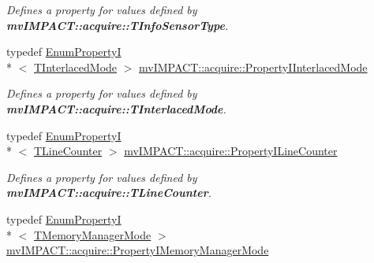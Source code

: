 \begin{DoxyCompactItemize}
\begin{DoxyCompactList}\small\item\em Defines a property for values defined by {\bfseries mv\+I\+M\+P\+A\+C\+T\+::acquire\+::\+T\+Info\+Sensor\+Type}. \end{DoxyCompactList}\item 
\hypertarget{group___device_specific_interface_gad01158960a8635ab8a2bd3199056045c}{typedef \hyperlink{classmv_i_m_p_a_c_t_1_1acquire_1_1_enum_property_i}{Enum\+Property\+I}\\*
$<$ \hyperlink{group___device_specific_interface_gafb928ff52f5c386fa1bac255d6850ff9}{T\+Interlaced\+Mode} $>$ \hyperlink{group___device_specific_interface_gad01158960a8635ab8a2bd3199056045c}{mv\+I\+M\+P\+A\+C\+T\+::acquire\+::\+Property\+I\+Interlaced\+Mode}}\label{group___device_specific_interface_gad01158960a8635ab8a2bd3199056045c}

\begin{DoxyCompactList}\small\item\em Defines a property for values defined by {\bfseries mv\+I\+M\+P\+A\+C\+T\+::acquire\+::\+T\+Interlaced\+Mode}. \end{DoxyCompactList}\item 
\hypertarget{group___device_specific_interface_ga104cc83eecc5f80f03154860ac2068ff}{typedef \hyperlink{classmv_i_m_p_a_c_t_1_1acquire_1_1_enum_property_i}{Enum\+Property\+I}\\*
$<$ \hyperlink{group___device_specific_interface_gab9051a0d97eafeaff2951aa0196f14eb}{T\+Line\+Counter} $>$ \hyperlink{group___device_specific_interface_ga104cc83eecc5f80f03154860ac2068ff}{mv\+I\+M\+P\+A\+C\+T\+::acquire\+::\+Property\+I\+Line\+Counter}}\label{group___device_specific_interface_ga104cc83eecc5f80f03154860ac2068ff}

\begin{DoxyCompactList}\small\item\em Defines a property for values defined by {\bfseries mv\+I\+M\+P\+A\+C\+T\+::acquire\+::\+T\+Line\+Counter}. \end{DoxyCompactList}\item 
\hypertarget{group___device_specific_interface_ga7c5c7c1188a4d20b4d61879c6597000d}{typedef \hyperlink{classmv_i_m_p_a_c_t_1_1acquire_1_1_enum_property_i}{Enum\+Property\+I}\\*
$<$ \hyperlink{group___common_interface_ga36f8c9739d1454dc75f980421ce5a6b6}{T\+Memory\+Manager\+Mode} $>$ \hyperlink{group___device_specific_interface_ga7c5c7c1188a4d20b4d61879c6597000d}{mv\+I\+M\+P\+A\+C\+T\+::acquire\+::\+Property\+I\+Memory\+Manager\+Mode}}\label{group___device_specific_interface_ga7c5c7c1188a4d20b4d61879c6597000d}


\end{DoxyCompactItemize}
